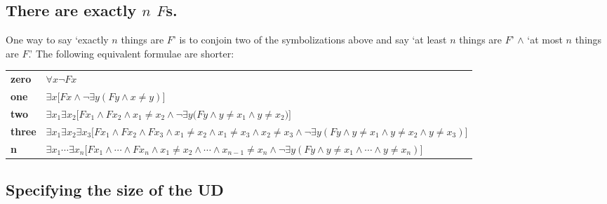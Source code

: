 \subsection{There are exactly $n$ $F$s.}


One way to say `exactly $n$ things are $F$' is to conjoin two of the symbolizations above and say `at least $n$ things are $F$' $\land$ `at most $n$ things are $F$.' The following equivalent formulae are shorter:
\begin{longtabu} to \textwidth {X[1,r] X[7,l]}
\textbf{zero} & $\forall x\lnot Fx$ \\

\textbf{one} & $\exists x\bigl[Fx \land \lnot\exists y(Fy \land x\neq y)\bigr]$ \\

\textbf{two} &  $\exists x_1\exists x_2\bigl[Fx_1 \land Fx_2 \land x_1 \neq x_2 \land \lnot\exists y\bigl(Fy \land y\neq x_1 \land y \neq x_2\bigr) \bigr]$ \\

\textbf{three} & $\exists x_1\exists x_2\exists x_3\bigl[Fx_1 \land Fx_2 \land Fx_3 \land x_1 \neq x_2 \land x_1 \neq x_3 \land x_2 \neq x_3 \land \lnot\exists y(Fy \land y \neq x_1 \land y \neq x_2 \land y\neq x_3) \bigr]$ \\

\textbf{n} & $\exists x_1\cdots\exists x_n\bigl[Fx_1 \land\cdots\land Fx_n  \land x_1 \neq x_2 \land\cdots\land x_{n-1}\neq x_n \land  \lnot\exists y(Fy \land y\neq x_1 \land \cdots \land y\neq x_n)\bigr]$ \\
\end{longtabu}

\subsection{Specifying the size of the UD}

